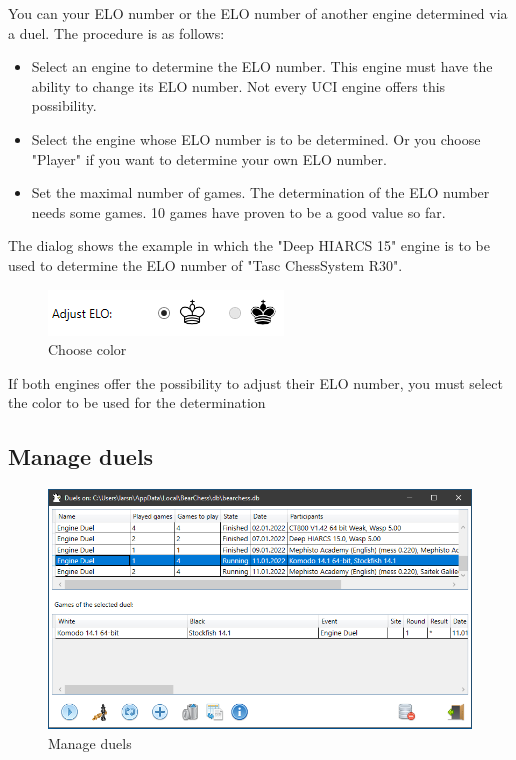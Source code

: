 \documentclass[11pt,a4paper]{article}
\begin{document}
You can your ELO number or the ELO number of another engine determined via a duel.
The procedure is as follows:
\begin{itemize}
	 \item Select an engine to determine the ELO number. This engine must have the ability to change its ELO number. Not every UCI engine offers this possibility. 
	 \item Select the engine whose ELO number is to be determined. Or you choose "Player" if you want to determine your own ELO number.
	 \item Set the maximal number of games. The determination of the ELO number needs some games. 10 games have proven to be a good value so far.
\end{itemize}	 

The dialog shows the example in which the "Deep HIARCS 15" engine is to be used to determine the ELO number of "Tasc ChessSystem R30".

\begin{figure}[H]
	\centering
	\includegraphics[scale=1.00]{EstimateElo2.png}
	\caption{Choose color}
	\label{fig:EstimateElo2}
\end{figure}
If both engines offer the possibility to adjust their ELO number, you must select the color to be used for the determination

\subsection{Manage duels}

\begin{figure}[H]
	\centering
	\includegraphics[scale=0.6]{EngineDuel6.png}
	\caption{Manage duels}
	\label{fig:EngineDuel6}
\end{figure}
\end{document}
